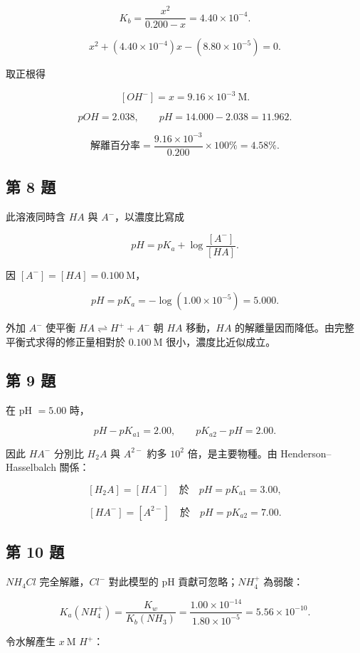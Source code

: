 \documentclass[11pt,a4paper]{article}
\begin{document}
\[
K_b=\frac{x^2}{0.200-x}=4.40\times10^{-4}.
\]

\[
x^2+(4.40\times10^{-4})x-(8.80\times10^{-5})=0.
\]

取正根得

\[
[OH^-]=x=9.16\times10^{-3}\ \mathrm M.
\]

\[
pOH=2.038,\qquad pH=14.000-2.038=11.962.
\]

\[
\text{解離百分率}=\frac{9.16\times10^{-3}}{0.200}\times100\%
=4.58\%.
\]

\subsection{第 8 題}\label{ux7b2c-8-ux984c}

此溶液同時含 \(HA\) 與 \(A^-\)，以濃度比寫成

\[
pH=pK_a+\log\frac{[A^-]}{[HA]}.
\]

因 \([A^-]=[HA]=0.100\ \mathrm M\)，

\[
pH=pK_a=-\log(1.00\times10^{-5})=5.000.
\]

外加 \(A^-\) 使平衡
\(HA\rightleftharpoons H^++A^-\)
朝 \(HA\) 移動，\(HA\) 的解離量因而降低。由完整平衡式求得的修正量相對於 \(0.100\ \mathrm M\) 很小，濃度比近似成立。

\subsection{第 9 題}\label{ux7b2c-9-ux984c}

在 pH \(=5.00\) 時，

\[
pH-pK_{a1}=2.00,\qquad pK_{a2}-pH=2.00.
\]

因此 \(HA^-\) 分別比 \(H_2A\) 與 \(A^{2-}\) 約多 \(10^2\) 倍，是主要物種。由 Henderson--Hasselbalch 關係：

\[
[H_2A]=[HA^-]\quad\text{於}\quad pH=pK_{a1}=3.00,
\]

\[
[HA^-]=[A^{2-}]\quad\text{於}\quad pH=pK_{a2}=7.00.
\]

\subsection{第 10 題}\label{ux7b2c-10-ux984c}

\(NH_4Cl\) 完全解離，\(Cl^-\) 對此模型的 pH 貢獻可忽略；\(NH_4^+\) 為弱酸：

\[
K_a(NH_4^+)=\frac{K_w}{K_b(NH_3)}
=\frac{1.00\times10^{-14}}{1.80\times10^{-5}}
=5.56\times10^{-10}.
\]

令水解產生 \(x\ \mathrm M\) \(H^+\)：
\end{document}

